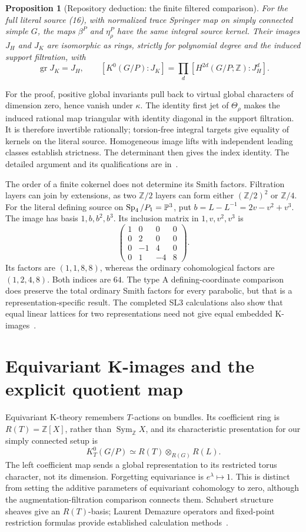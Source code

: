 \documentclass[11pt,letterpaper]{article}
\newcommand{\Z}{\mathbb Z}\newcommand{\Q}{\mathbb Q}\newcommand{\C}{\mathbb C}
\newcommand{\Sym}{\operatorname{Sym}}\newcommand{\Rep}{\operatorname{Rep}}
\newtheorem{proposition}[theorem]{Proposition}
\theoremstyle{definition}\newtheorem{definition}[theorem]{Definition}
\begin{document}
\begin{proposition}[Repository deduction: the finite filtered comparison]
For the full literal source (16), with normalized trace Springer map
on simply connected simple \(G\), the maps \(\beta^P\) and
\(\eta_\rho^P\) have the same integral source kernel.
Their images \(J_H\) and \(J_K\) are isomorphic as rings, strictly
for polynomial degree and the induced support filtration, with
\[
 \operatorname{gr}J_K=J_H,\qquad
 [K^0(G/P):J_K]=\prod_d[H^{2d}(G/P;\Z):J_H^d].
 \tag{34}
\]
\end{proposition}
\noindent
For the proof, positive global invariants pull back to virtual
global characters of dimension zero, hence vanish under \(\kappa\).
The identity first jet of \(\Theta_\rho\) makes the induced rational
map triangular with identity diagonal in the support filtration.
It is therefore invertible rationally; torsion-free integral targets
give equality of kernels on the literal source.
Homogeneous image lifts with independent leading classes establish
strictness. The determinant then gives the index identity.
The detailed argument and its qualifications are in~\cite{Exploration}.

The order of a finite cokernel does not determine its Smith factors.
Filtration layers can join by extensions, as two \(\Z/2\) layers can
form either \((\Z/2)^2\) or \(\Z/4\).
For the literal defining source on \(\operatorname{Sp}_4/P_1=\mathbb P^3\), put
\(b=L-L^{-1}=2v-v^2+v^3\). The image has basis \(1,b,b^2,b^3\).
Its inclusion matrix in \(1,v,v^2,v^3\) is
\[
 \begin{pmatrix}
 1&0&0&0\\0&2&0&0\\0&-1&4&0\\0&1&-4&8
 \end{pmatrix}.
\]
Its factors are \((1,1,8,8)\), whereas the ordinary cohomological
factors are \((1,2,4,8)\). Both indices are \(64\).
The type A defining-coordinate comparison does preserve the total
ordinary Smith factors for every parabolic, but that is a
representation-specific result. The completed SL3 calculations
also show that equal linear lattices for two representations need
not give equal embedded K-images~\cite{Exploration}.

\section{Equivariant K-images and the explicit quotient map}
Equivariant K-theory remembers \(T\)-actions on bundles. Its coefficient
ring is \(R(T)=\Z[X]\), rather than \(\Sym_\Z X\), and its characteristic
presentation for our simply connected setup is
\[
 K_T^0(G/P)\simeq R(T)\otimes_{R(G)}R(L).
 \tag{35}
\]
The left coefficient map sends a global representation to its
restricted torus character, not its dimension.
Forgetting equivariance is \(e^\lambda\mapsto1\).
This is distinct from setting the additive parameters of equivariant
cohomology to zero, although the augmentation-filtration comparison
connects them. Schubert structure sheaves give an \(R(T)\)-basis;
Laurent Demazure operators and fixed-point restriction formulas
provide established calculation methods~\cite{GR,Willems}.
\end{document}
